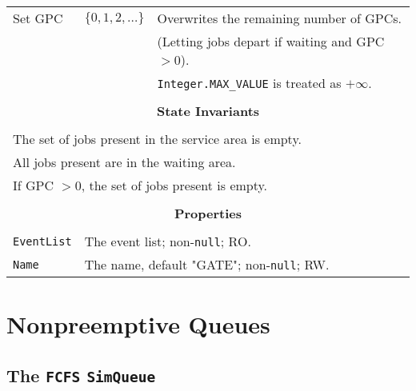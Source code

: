 \documentclass[12pt]{book}
\begin{document}
\begin{tabular}{|l|l|l|}
\hline
Set GPC & $\{0, 1, 2, \ldots\}$ & Overwrites the remaining number of GPCs. \\
        &                       & (Letting jobs depart if waiting and GPC $ > 0$). \\
        &                       & \lstinline|Integer.MAX_VALUE| is treated as $+\infty$. \\
\hline
\multicolumn{3}{|c|}{} \\
\multicolumn{3}{|c|}{\bf State  Invariants} \\
\multicolumn{3}{|c|}{} \\
\hline
\multicolumn{3}{|l|}{The set of jobs present in the service area is empty.} \\
\multicolumn{3}{|l|}{All jobs present are in the waiting area.} \\
\multicolumn{3}{|l|}{If GPC $> 0$, the set of jobs present is empty.} \\
\hline
\multicolumn{3}{|c|}{} \\
\multicolumn{3}{|c|}{\bf Properties} \\
\multicolumn{3}{|c|}{} \\
\hline
\lstinline|EventList| & \multicolumn{2}{|l|}{The event list; non-\lstinline|null|; RO.} \\
\hline
\lstinline|Name|      & \multicolumn{2}{|l|}{The name, default "GATE"; non-\lstinline|null|; RW.} \\
\hline
\end{tabular}

\section{Nonpreemptive Queues}

\subsection{The \lstinline{FCFS} \lstinline{SimQueue}}
\end{document}
